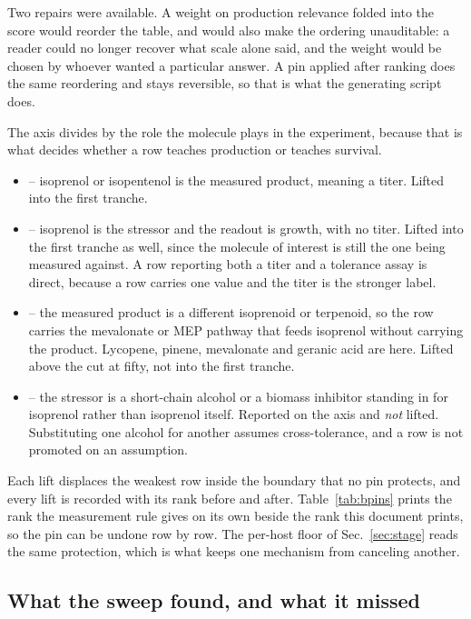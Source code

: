 Two repairs were available. A weight on production relevance folded into the score would
reorder the table, and would also make the ordering unauditable: a reader could no longer
recover what scale alone said, and the weight would be chosen by whoever wanted a
particular answer. A pin applied after ranking does the same reordering and stays
reversible, so that is what the generating script does.

The axis divides by the role the molecule plays in the experiment, because that is what
decides whether a row teaches production or teaches survival.

\begin{itemize}[leftmargin=1.2em,itemsep=1pt,topsep=2pt]
  \item {} -- isoprenol or isopentenol is the measured product, meaning a
    titer. Lifted into the first tranche.
  \item {} -- isoprenol is the stressor and the readout is growth, with no
    titer. Lifted into the first tranche as well, since the molecule of interest is still
    the one being measured against. A row reporting both a titer and a tolerance assay is
    direct, because a row carries one value and the titer is the stronger label.
  \item {} -- the measured product is a different isoprenoid or terpenoid,
    so the row carries the mevalonate or MEP pathway that feeds isoprenol without
    carrying the product. Lycopene, pinene, mevalonate and geranic acid are here. Lifted
    above the cut at fifty, not into the first tranche.
  \item {} -- the stressor is a short-chain alcohol or a biomass inhibitor
    standing in for isoprenol rather than isoprenol itself. Reported on the axis and
    \emph{not} lifted. Substituting one alcohol for another assumes cross-tolerance, and
    a row is not promoted on an assumption.
\end{itemize}

Each lift displaces the weakest row inside the boundary that no pin protects, and every
lift is recorded with its rank before and after. Table~\ref{tab:bpins} prints the rank the
measurement rule gives on its own beside the rank this document prints, so the pin can be
undone row by row. The per-host floor of Sec.~\ref{sec:stage} reads the same protection,
which is what keeps one mechanism from canceling another.

\subsection{What the sweep found, and what it missed}\label{sec:sweep}

